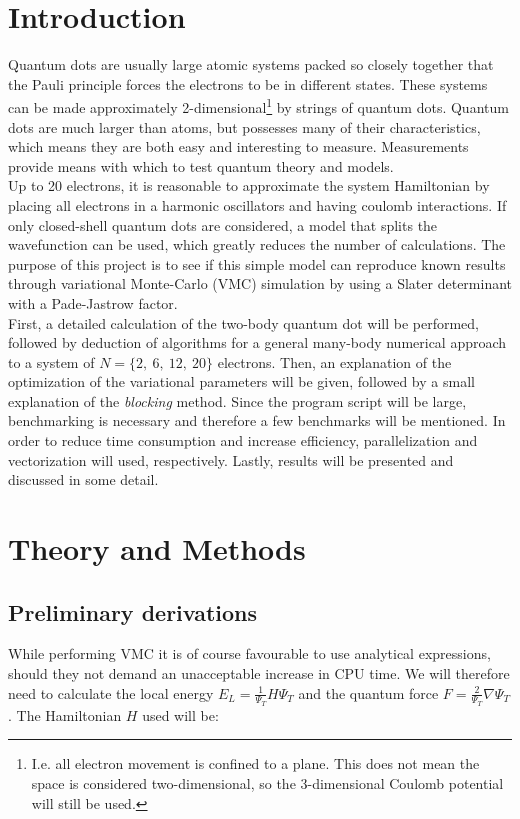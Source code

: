 \documentclass[english, a4paper]{article}
\begin{document}
	\section{Introduction}
	Quantum dots are usually large atomic systems packed so closely together that the Pauli principle forces the electrons to be in different states. These systems can be made approximately 2-dimensional\footnote{I.e. all electron movement is confined to a plane. This does not mean the space is considered two-dimensional, so the 3-dimensional Coulomb potential will still be used.} by strings of quantum dots. Quantum dots are much larger than atoms, but possesses many of their characteristics, which means they are both easy and interesting to measure. Measurements provide means with which to test quantum theory and models.\\
	Up to 20 electrons, it is reasonable to approximate the system Hamiltonian by placing all electrons in a harmonic oscillators and having coulomb interactions. If only closed-shell quantum dots are considered, a model that splits the wavefunction can be used, which greatly reduces the number of calculations. The purpose of this project is to see if this simple model can reproduce known results through variational Monte-Carlo (VMC) simulation by using a Slater determinant with a Pade-Jastrow factor.\\
	First, a detailed calculation of the two-body quantum dot will be performed, followed by deduction of algorithms for a general many-body numerical approach to a system of $N=\{2,\:6,\:12,\:20\}$ electrons. Then, an explanation of the optimization of the variational parameters will be given, followed by a small explanation of the \emph{blocking} method. Since the program script will be large, benchmarking is necessary and therefore a few benchmarks will be mentioned. In order to reduce time consumption and increase efficiency, parallelization and vectorization will used, respectively.
	Lastly, results will be presented and discussed in some detail.
	
	\section{Theory and Methods}
	\subsection{Preliminary derivations}
	While performing VMC it is of course favourable to use analytical expressions, should they not demand an unacceptable increase in CPU time. We will therefore need to calculate the local energy $E_L = \frac{1}{\Psi_T}H\Psi_T$ and the quantum force $F = \frac{2}{\Psi_T}\nabla\Psi_T$. The Hamiltonian $H$ used will be:
	
\end{document}
